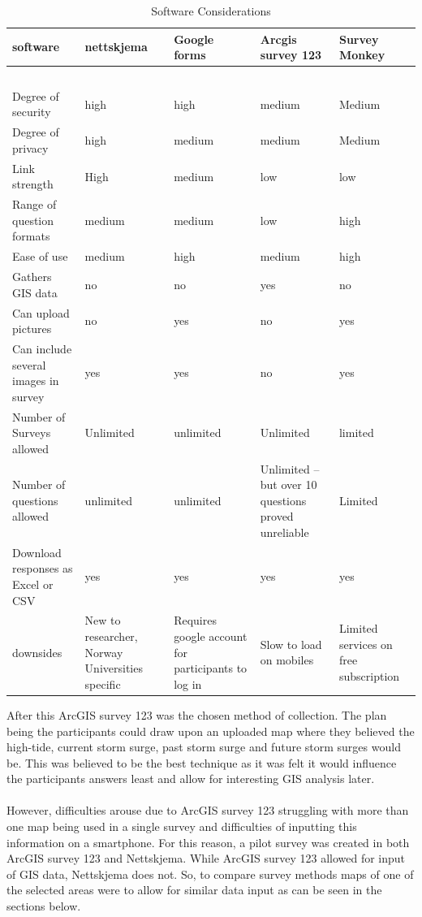 \begin{table}[!ht]
    \centering
    \begin{tabular}{|l|l|l|l|l|}
    \hline
        software & nettskjema & Google forms & Arcgis survey 123 & Survey Monkey \\ \hline
        ~ & ~ & ~ & ~ & ~ \\ \hline
        Degree of security & high & high & medium & Medium \\ \hline
        Degree of privacy & high & medium & medium & Medium \\ \hline
        Link strength & High & medium & low & low \\ \hline
        Range of question formats & medium & medium & low & high \\ \hline
        Ease of use & medium & high & medium & high \\ \hline
        Gathers GIS data & no & no & yes & no \\ \hline
        Can upload pictures & no & yes & no & yes \\ \hline
        Can include several images in survey & yes & yes & no & yes \\ \hline
        Number of Surveys allowed & Unlimited & unlimited & Unlimited & limited \\ \hline
        Number of questions allowed & unlimited & unlimited & Unlimited – but over 10 questions proved unreliable & Limited \\ \hline
        Download responses as Excel or CSV & yes & yes & yes & yes \\ \hline
        downsides & New to researcher, Norway Universities specific & Requires google account for participants to log in & Slow to load on mobiles & Limited services on free subscription \\ \hline
    \end{tabular}
    \caption{Software Considerations}
    \label{table: software-considerations}
\end{table}

After this ArcGIS survey 123 was the chosen method of collection. The plan being the participants could draw upon an uploaded map where they believed the high-tide, current storm surge, past storm surge and future storm surges would be. This was believed to be the best technique as it was felt it would influence the participants answers least and allow for interesting GIS analysis later. 
\paragraph{}
However, difficulties arouse due to ArcGIS survey 123 struggling with more than one map being used in a single survey and difficulties of inputting this information on a smartphone. For this reason, a pilot survey was created in both ArcGIS survey 123 and Nettskjema. While ArcGIS survey 123 allowed for input of GIS data, Nettskjema does not. So, to compare survey methods maps of one of the selected areas were to allow for similar data input as can be seen in the sections below. 

